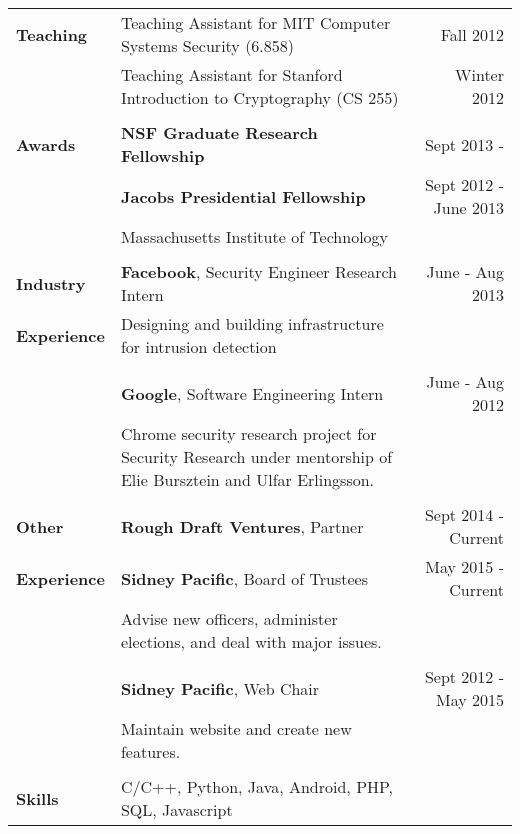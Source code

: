\documentclass[a4paper,10pt]{article}
\begin{document}
\begin{tabular*}{0.95 \textwidth} { p{0.9in} l @{\extracolsep{\fill}} r}
\textbf{Teaching} 
& Teaching Assistant for MIT Computer Systems Security (6.858) & Fall 2012 \\
& Teaching Assistant for Stanford Introduction to Cryptography (CS 255) & Winter 2012 \\ \\

\textbf{Awards} & \textbf{NSF Graduate Research Fellowship} & Sept 2013 - \\
& \textbf{Jacobs Presidential Fellowship} & Sept 2012 - June 2013\\
& Massachusetts Institute of Technology \\
\\

\textbf{Industry}  & \textbf{Facebook}, Security Engineer Research Intern & June - Aug 2013 \\
\textbf{Experience} & \begin{minipage}[t]{0.5 \textwidth} 
Designing and building infrastructure for intrusion detection
\end{minipage}
& \\ \\
& \textbf{Google}, Software Engineering Intern & June - Aug 2012 \\
& \begin{minipage}[t]{0.5 \textwidth} 
Chrome security research project for Security Research under mentorship of Elie Bursztein and Ulfar Erlingsson.
\end{minipage}
& \\ \\

\textbf{Other} & \textbf{Rough Draft Ventures}, Partner & Sept 2014 - Current \\
\textbf{Experience} & \textbf{Sidney Pacific}, Board of Trustees & May 2015 - Current \\
  & \begin{minipage}[t]{0.5 \textwidth}
  Advise new officers, administer elections, and deal with major issues.
  \end{minipage} & \\ \\
  & \textbf{Sidney Pacific}, Web Chair & Sept 2012 - May 2015 \\
 & \begin{minipage}[t]{0.5 \textwidth}
Maintain website and create new features.
\end{minipage}
& \\ \\

\textbf{Skills} &  C/C++, Python, Java, Android, PHP, SQL, Javascript & 

\end{tabular*}
\end{document}
